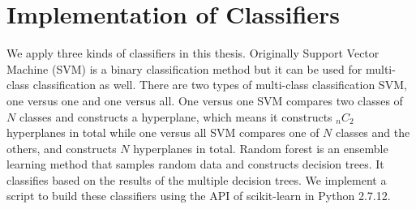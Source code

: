 \section{Implementation of Classifiers}
We apply three kinds of classifiers in this thesis.
Originally Support Vector Machine (SVM) is a binary classification method but it can be used for multi-class classification as well.
There are two types of multi-class classification SVM, one versus one and one versus all.
One versus one SVM compares two classes of $N$ classes and constructs a hyperplane, which means it constructs ${}_n C _2$ hyperplanes in total while one versus all SVM compares one of $N$ classes and the others, and constructs $N$ hyperplanes in total.
Random forest is an ensemble learning method that samples random data and constructs decision trees.
It classifies based on the results of the multiple decision trees. 
We implement a script to build these classifiers using the API of scikit-learn \cite{scikit} in Python 2.7.12.


